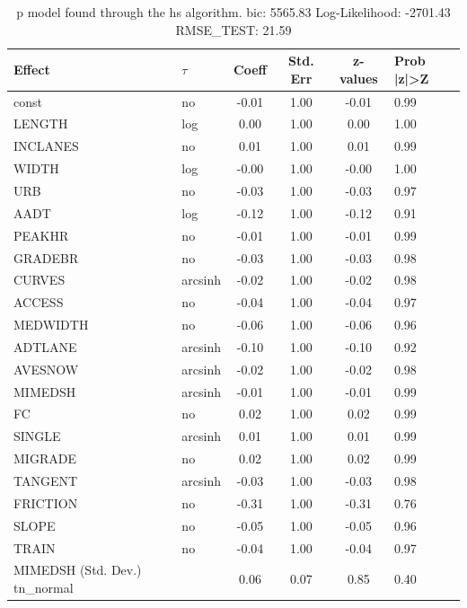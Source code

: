 \begin{table}
	\caption{p model found through the hs algorithm. bic: 5565.83 Log-Likelihood: -2701.43 RMSE_TEST: 21.59}
	\begin{center}
		\begin{tabular}{|l|l|c|c|c|l|}
			\hline
			Effect & $\tau$ & Coeff & Std. Err & z-values & Prob |z|>Z \\
			\hline
			const & no & -0.01 & 1.00 & -0.01 & 0.99 \\
			\hline
			LENGTH & log & 0.00 & 1.00 & 0.00 & 1.00 \\
			\hline
			INCLANES & no & 0.01 & 1.00 & 0.01 & 0.99 \\
			\hline
			WIDTH & log & -0.00 & 1.00 & -0.00 & 1.00 \\
			\hline
			URB & no & -0.03 & 1.00 & -0.03 & 0.97 \\
			\hline
			AADT & log & -0.12 & 1.00 & -0.12 & 0.91 \\
			\hline
			PEAKHR & no & -0.01 & 1.00 & -0.01 & 0.99 \\
			\hline
			GRADEBR & no & -0.03 & 1.00 & -0.03 & 0.98 \\
			\hline
			CURVES & arcsinh & -0.02 & 1.00 & -0.02 & 0.98 \\
			\hline
			ACCESS & no & -0.04 & 1.00 & -0.04 & 0.97 \\
			\hline
			MEDWIDTH & no & -0.06 & 1.00 & -0.06 & 0.96 \\
			\hline
			ADTLANE & arcsinh & -0.10 & 1.00 & -0.10 & 0.92 \\
			\hline
			AVESNOW & arcsinh & -0.02 & 1.00 & -0.02 & 0.98 \\
			\hline
			MIMEDSH & arcsinh & -0.01 & 1.00 & -0.01 & 0.99 \\
			\hline
			FC & no & 0.02 & 1.00 & 0.02 & 0.99 \\
			\hline
			SINGLE & arcsinh & 0.01 & 1.00 & 0.01 & 0.99 \\
			\hline
			MIGRADE & no & 0.02 & 1.00 & 0.02 & 0.99 \\
			\hline
			TANGENT & arcsinh & -0.03 & 1.00 & -0.03 & 0.98 \\
			\hline
			FRICTION & no & -0.31 & 1.00 & -0.31 & 0.76 \\
			\hline
			SLOPE & no & -0.05 & 1.00 & -0.05 & 0.96 \\
			\hline
			TRAIN & no & -0.04 & 1.00 & -0.04 & 0.97 \\
			\hline
			MIMEDSH (Std. Dev.) tn_normal &  & 0.06 & 0.07 & 0.85 & 0.40 \\

\end{tabular}
\end{center}
\end{table}
